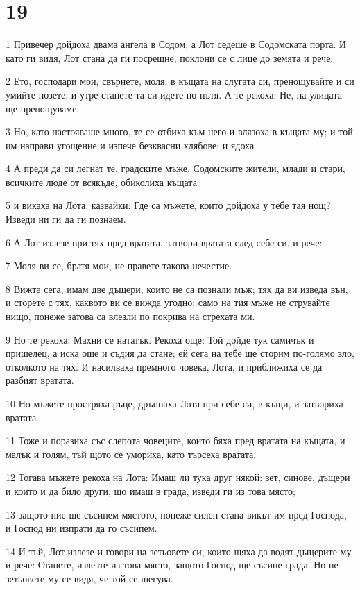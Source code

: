 \chapter{19}

\par 1 Привечер дойдоха двама ангела в Содом; а Лот седеше в Содомската порта. И като ги видя, Лот стана да ги посрещне, поклони се с лице до земята и рече:
\par 2 Ето, господари мои, свърнете, моля, в къщата на слугата си, пренощувайте и си умийте нозете, и утре станете та си идете по пътя. А те рекоха: Не, на улицата ще пренощуваме.
\par 3 Но, като настояваше много, те се отбиха към него и влязоха в къщата му; и той им направи угощение и изпече безквасни хлябове; и ядоха.
\par 4 А преди да си легнат те, градските мъже, Содомските жители, млади и стари, всичките люде от всякъде, обиколиха къщата
\par 5 и викаха на Лота, казвайки: Где са мъжете, които дойдоха у тебе тая нощ? Изведи ни ги да ги познаем.
\par 6 А Лот излезе при тях пред вратата, затвори вратата след себе си, и рече:
\par 7 Моля ви се, братя мои, не правете такова нечестие.
\par 8 Вижте сега, имам две дъщери, които не са познали мъж; тях да ви изведа вън, и сторете с тях, каквото ви се вижда угодно; само на тия мъже не струвайте нищо, понеже затова са влезли по покрива на стрехата ми.
\par 9 Но те рекоха: Махни се нататък. Рекоха още: Той дойде тук самичък и пришелец, а иска още и съдия да стане; ей сега на тебе ще сторим по-голямо зло, отколкото на тях. И насилваха премного човека, Лота, и приближиха се да разбият вратата.
\par 10 Но мъжете простряха ръце, дръпнаха Лота при себе си, в къщи, и затвориха вратата.
\par 11 Тоже и поразиха със слепота човеците, които бяха пред вратата на къщата, и малък и голям, тъй щото се умориха, като търсеха вратата.
\par 12 Тогава мъжете рекоха на Лота: Имаш ли тука друг някой: зет, синове, дъщери и които и да било други, що имаш в града, изведи ги из това място;
\par 13 защото ние ще съсипем мястото, понеже силен стана викът им пред Господа, и Господ ни изпрати да го съсипем.
\par 14 И тъй, Лот излезе и говори на зетьовете си, които щяха да водят дъщерите му и рече: Станете, излезте из това място, защото Господ ще съсипе града. Но не зетьовете му се видя, че той се шегува.
